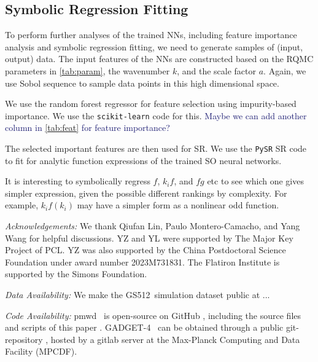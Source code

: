 \documentclass[modern, trackchanges, dvipsnames]{aastex631}
\newcommand{\pmwd}{{\usefont{T1}{nova}{m}{sl}pmwd}}
\newcommand{\GADGET}{{{\fontsize{10pt}{12pt}\selectfont GADGET}-4}}
\newcommand{\GSDATA}{{GS512}}
\newcommand{\YL}[1]{\textcolor{Bittersweet}{#1}}
\newcommand{\YZ}[1]{\textcolor{MidnightBlue}{#1}}
\begin{document}
\vspace{1em}
\subsection{Symbolic Regression Fitting}

To perform further analyses of the trained NNs, including feature
importance analysis and symbolic regression fitting, we need to generate
samples of (input, output) data.
The input features of the NNs are constructed based on the RQMC
parameters in \autoref{tab:param}, the wavenumber $k$, and the scale
factor $a$.
Again, we use Sobol sequence to sample data points in this high
dimensional space.

We use the random forest regressor for feature selection using
impurity-based importance.
We use the \texttt{scikit-learn} \citep{scikit-learn} code for this.
\YZ{Maybe we can add another column in \autoref{tab:feat} for feature
importance?}

The selected important features are then used for SR.
We use the \texttt{PySR} \citep{PySR} SR code to fit for analytic
function expressions of the trained SO neural networks.

\YL{It is interesting to symbolically regress $f$, $k_i f$, and $f g$
etc to see which one gives simpler expression, given the possible
different rankings by complexity.
For example, $k_i f(k_i)$ may have a simpler form as a nonlinear odd
function.}


\vspace{1em}
\textit{\large Acknowledgements:}
We thank Qiufan Lin, Paulo Montero-Camacho, and Yang Wang for helpful
discussions.
YZ and YL were supported by The Major Key Project of PCL.
YZ was also supported by the China Postdoctoral Science Foundation under
award number 2023M731831.
The Flatiron Institute is supported by the Simons Foundation.


\vspace{1em}
\textit{\large Data Availability:}
We make the \GSDATA\ simulation dataset public at ...


\vspace{1em}
\textit{\large Code Availability:}
\pmwd\ \citep{Li2022b} is open-source on GitHub
\href{https://github.com/eelregit/pmwd}{\faGithub}, including the source
files and scripts of this paper
\href{https://github.com/eelregit/pmwd/tree/master/docs/papers/sto}{\faFile}.
\GADGET\ \citep{GADGET-4} can be obtained through a public
git-repository \href{http://gitlab.mpcdf.mpg.de/vrs/gadget4}{\faGitlab},
hosted by a gitlab server at the Max-Planck Computing and Data Facility
(MPCDF).
\end{document}
